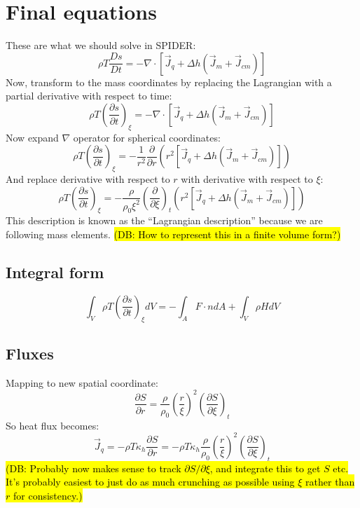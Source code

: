 \documentclass[12pt,notitlepage]{article}
\newcommand{\dbnote}[1]{\sethlcolor{bluehl}\hl{(DB: #1)}}
\begin{document}
\section{Final equations}
These are what we should solve in SPIDER:
\begin{equation}
\rho T \frac{Ds}{Dt} = -\nabla \cdot \left[ \vec{J}_q + \Delta h (\vec{J}_m + \vec{J}_{cm}) \right]
\end{equation}
Now, transform to the mass coordinates by replacing the Lagrangian with a partial derivative with respect to time:
\begin{equation}
\rho T \left( \frac{\partial s}{\partial t} \right)_\xi = -\nabla \cdot \left[ \vec{J}_q + \Delta h (\vec{J}_m + \vec{J}_{cm}) \right]
\end{equation}
Now expand $\nabla$ operator for spherical coordinates:
\begin{equation}
\rho T \left( \frac{\partial s}{\partial t} \right)_\xi = -\frac{1}{r^2} \frac{\partial}{\partial r} \left( r^2 \left[ \vec{J}_q + \Delta h (\vec{J}_m + \vec{J}_{cm}) \right] \right)
\end{equation}
And replace derivative with respect to $r$ with derivative with respect to $\xi$:
\begin{equation}
\rho T \left( \frac{\partial s}{\partial t} \right)_\xi = - \frac{\rho}{\rho_0 \xi^2} \left(\frac{\partial}{\partial \xi} \right)_t \left( r^2 \left[ \vec{J}_q + \Delta h (\vec{J}_m + \vec{J}_{cm}) \right] \right)
\label{eq:finals}
\end{equation}
This description is known as the ``Lagrangian description'' \citep[e.g.,][]{KWW12} because we are following mass elements.  \dbnote{How to represent this in a finite volume form?}
\subsection{Integral form}
\begin{equation}
\int_V \rho T \left( \frac{\partial s}{\partial t} \right)_\xi dV = - \int_A F \cdot n dA + \int_V \rho H dV
\end{equation}
\subsection{Fluxes}
Mapping to new spatial coordinate:
\begin{equation}
\frac{\partial S}{\partial r}=\frac{\rho}{\rho_0} \left( \frac{r}{\xi} \right)^2 \left(\frac{\partial S}{\partial \xi} \right)_t
\end{equation}
So heat flux becomes:
\begin{equation}
\vec{J}_q=-\rho T \kappa_h \frac{\partial S}{\partial r} = -\rho T \kappa_h \frac{\rho}{\rho_0} \left( \frac{r}{\xi} \right)^2 \left(\frac{\partial S}{\partial \xi} \right)_t
\end{equation}
\dbnote{Probably now makes sense to track $\partial S/\partial \xi$, and integrate this to get $S$ etc.  It's probably easiest to just do as much crunching as possible using $\xi$ rather than $r$ for consistency.}
\end{document}

